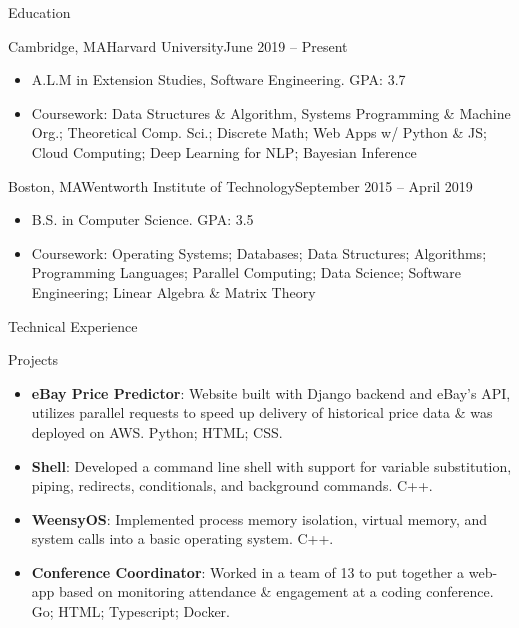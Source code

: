\documentclass[]{mcdowellcv}
\begin{document}
	\begin{cvsection}{Education}
		\begin{cvsubsection}{Cambridge, MA}{Harvard University}{June 2019 -- Present}
		
			\begin{itemize}
				\item A.L.M in Extension Studies, Software Engineering. GPA: 3.7
				\item Coursework: Data Structures \& Algorithm, Systems Programming \& Machine Org.; Theoretical Comp. Sci.; Discrete Math; Web Apps w/ Python \& JS; Cloud Computing; Deep Learning for NLP; Bayesian Inference
				\end{itemize}
		\end{cvsubsection}
		\begin{cvsubsection}{Boston, MA}{Wentworth Institute of Technology}{September 2015 -- April 2019}
		\vspace{2mm}
			\begin{itemize}
				\item B.S. in Computer Science. GPA: 3.5
				\item Coursework: Operating Systems; Databases; Data Structures; Algorithms; Programming Languages; Parallel Computing; Data Science; Software Engineering; Linear Algebra \& Matrix Theory
			\end{itemize}
		\end{cvsubsection}
	\end{cvsection}
	
	\begin{cvsection}{Technical Experience}
		\begin{cvsubsection}{Projects}{}{}
			\begin{itemize}
				\item \textbf{eBay Price Predictor}: Website built with Django backend and eBay's API, utilizes parallel requests to speed up delivery of historical price data \& was deployed on AWS. Python; HTML; CSS.
				\item \textbf{Shell}: Developed a command line shell with support for variable substitution, piping, redirects, conditionals, and background commands. C++.
				\item \textbf{WeensyOS}: Implemented process memory isolation, virtual memory, and system calls into a basic operating system. C++.
				\item \textbf{Conference Coordinator}: Worked in a team of 13 to put together a web-app based on monitoring attendance \& engagement at a coding conference. Go; HTML; Typescript; Docker.
			\end{itemize}
		\end{cvsubsection}
	\end{cvsection}
	
\end{document}
